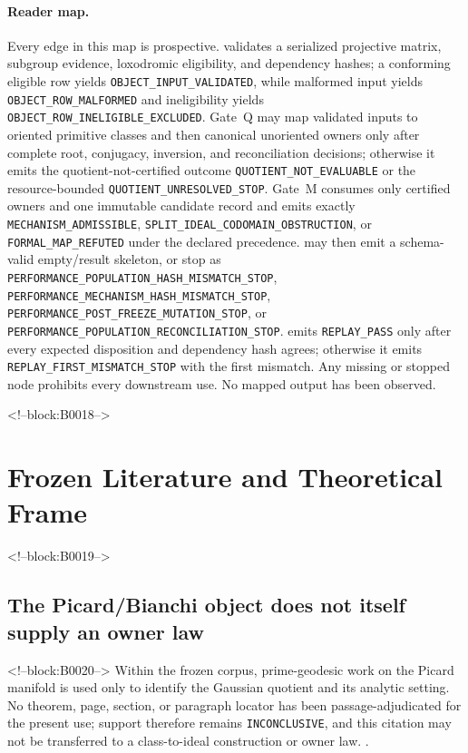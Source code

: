 \documentclass[11pt,a4paper]{article}
\begin{document}
\paragraph{Reader map.} Every edge in this map is prospective.  validates a serialized projective matrix, subgroup evidence, loxodromic eligibility, and dependency hashes; a conforming eligible row yields \texttt{OBJECT\_INPUT\_VALIDATED}, while malformed input yields \texttt{OBJECT\_ROW\_MALFORMED} and ineligibility yields \texttt{OBJECT\_ROW\_INELIGIBLE\_EXCLUDED}. Gate~Q may map validated inputs to oriented primitive classes and then canonical unoriented owners only after complete root, conjugacy, inversion, and reconciliation decisions; otherwise it emits the quotient-not-certified outcome \texttt{QUOTIENT\_NOT\_EVALUABLE} or the resource-bounded \texttt{QUOTIENT\_UNRESOLVED\_STOP}. Gate~M consumes only certified owners and one immutable candidate record and emits exactly \texttt{MECHANISM\_ADMISSIBLE}, \texttt{SPLIT\_IDEAL\_CODOMAIN\_OBSTRUCTION}, or \texttt{FORMAL\_MAP\_REFUTED} under the declared precedence.  may then emit a schema-valid empty/result skeleton, or stop as \texttt{PERFORMANCE\_POPULATION\_HASH\_MISMATCH\_STOP}, \texttt{PERFORMANCE\_MECHANISM\_HASH\_MISMATCH\_STOP}, \texttt{PERFORMANCE\_POST\_FREEZE\_MUTATION\_STOP}, or \texttt{PERFORMANCE\_POPULATION\_RECONCILIATION\_STOP}.  emits \texttt{REPLAY\_PASS} only after every expected disposition and dependency hash agrees; otherwise it emits \texttt{REPLAY\_FIRST\_MISMATCH\_STOP} with the first mismatch. Any missing or stopped node prohibits every downstream use. No mapped output has been observed.

<!--block:B0018-->
\section{Frozen Literature and Theoretical Frame}

<!--block:B0019-->
\subsection{The Picard/Bianchi object does not itself supply an owner law}

<!--block:B0020-->
Within the frozen corpus, prime-geodesic work on the Picard manifold is used only to identify the Gaussian quotient and its analytic setting. No theorem, page, section, or paragraph locator has been passage-adjudicated for the present use; support therefore remains \texttt{INCONCLUSIVE}, and this citation may not be transferred to a class-to-ideal construction or owner law.
\citep{P29-S01}.
\end{document}
